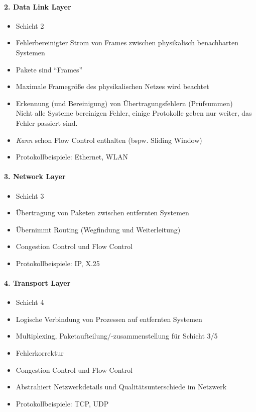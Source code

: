 \documentclass[a4paper, 11pt, accentcolor = tud3b]{tudreport}
\begin{document}
        \paragraph{2. Data Link Layer}
	        \begin{itemize}
	        	\item Schicht 2
	        	\item Fehlerbereinigter Strom von Frames zwischen physikalisch benachbarten Systemen
	        	\item Pakete sind \enquote{Frames}
	        	\item Maximale Framegröße des physikalischen Netzes wird beachtet
	        	\item Erkennung (und Bereinigung) von Übertragungsfehlern (Prüfsummen) \\ Nicht alle Systeme bereinigen Fehler, einige Protokolle geben nur weiter, das Fehler passiert sind.
	        	\item \textit{Kann} schon Flow Control enthalten (bspw. Sliding Window)
	        	\item Protokollbeispiele: Ethernet, WLAN
	        \end{itemize}
        
        \paragraph{3. Network Layer}
	        \begin{itemize}
	        	\item Schicht 3
	        	\item Übertragung von Paketen zwischen entfernten Systemen
	        	\item Übernimmt Routing (Wegfindung und Weiterleitung)
	        	\item Congestion Control und Flow Control
	        	\item Protokollbeispiele: IP, X.25
	        \end{itemize}
        
        \paragraph{4. Transport Layer}
	        \begin{itemize}
	        	\item Schicht 4
	        	\item Logische Verbindung von Prozessen auf entfernten Systemen
	        	\item Multiplexing, Paketaufteilung/-zusammenstellung für Schicht 3/5
	        	\item Fehlerkorrektur
	        	\item Congestion Control und Flow Control
	        	\item Abstrahiert Netzwerkdetails und Qualitätsunterschiede im Netzwerk
	        	\item Protokollbeispiele: TCP, UDP
	        \end{itemize}
        
\end{document}
